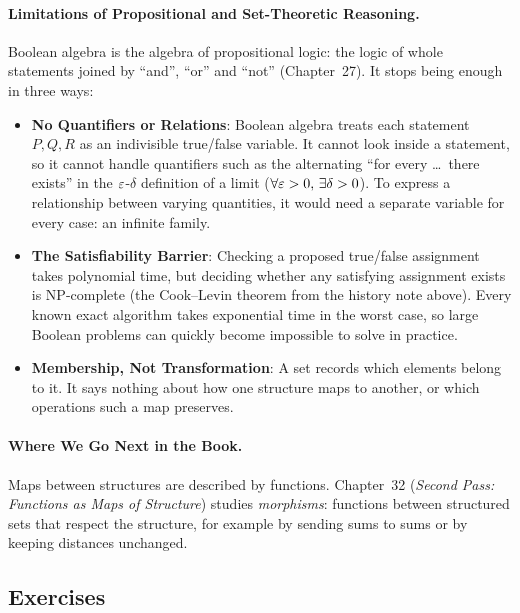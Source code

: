 \paragraph{Limitations of Propositional and Set-Theoretic Reasoning.}
Boolean algebra is the algebra of propositional logic: the logic of whole statements joined by ``and'', ``or'' and ``not'' (Chapter~27). It stops being enough in three ways:
\begin{itemize}
  \item \textbf{No Quantifiers or Relations}: Boolean algebra treats each statement $P, Q, R$ as an indivisible true/false variable. It cannot look inside a statement, so it cannot handle quantifiers such as the alternating ``for every \dots\ there exists'' in the $\varepsilon$-$\delta$ definition of a limit ($\forall \varepsilon > 0, \, \exists \delta > 0$). To express a relationship between varying quantities, it would need a separate variable for every case: an infinite family.
  \item \textbf{The Satisfiability Barrier}: Checking a proposed true/false assignment takes polynomial time, but deciding whether any satisfying assignment exists is NP-complete (the Cook--Levin theorem from the history note above). Every known exact algorithm takes exponential time in the worst case, so large Boolean problems can quickly become impossible to solve in practice.
  \item \textbf{Membership, Not Transformation}: A set records which elements belong to it. It says nothing about how one structure maps to another, or which operations such a map preserves.
\end{itemize}

\paragraph{Where We Go Next in the Book.}
Maps between structures are described by functions. Chapter~32 (\emph{Second Pass: Functions as Maps of Structure}) studies \emph{morphisms}: functions between structured sets that respect the structure, for example by sending sums to sums or by keeping distances unchanged.

\subsection{Exercises}

